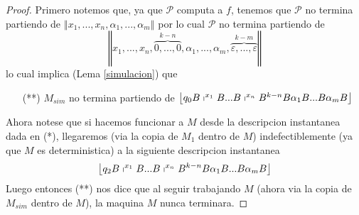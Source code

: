 \begin{frame}
\begin{proof}
  Primero notemos que, ya que $\mathcal{P}$ computa a $f$, tenemos que $%
  \mathcal{P}$ no termina partiendo de $\left\Vert x_{1},...,x_{n},\alpha
  _{1},...,\alpha _{m}\right\Vert $ por lo cual $\mathcal{P}$ no termina
  partiendo de%
  \begin{equation*}
  \left\Vert x_{1},...,x_{n},\overset{k-n}{\overbrace{0,...,0}},\alpha
  _{1},...,\alpha _{m},\overset{k-m}{\overbrace{\varepsilon ,...,\varepsilon }}%
  \right\Vert
  \end{equation*}%
  lo cual implica (Lema \ref{simulacion}) que

  \begin{enumerate}
  \item[(**)] $M_{sim}$ no termina partiendo de $\left\lfloor q_{0}B\shortmid
  ^{x_{1}}B...B\shortmid ^{x_{n}}B^{k-n}B\alpha _{1}B...B\alpha
  _{m}B\right\rfloor $
  \end{enumerate}

  Ahora notese que si hacemos funcionar a $M$ desde la descripcion instantanea
  dada en (*), llegaremos (via la copia de $M_{1}$ dentro de $M$)
  indefectiblemente (ya que $M$ es deterministica) a la siguiente descripcion
  instantanea%
  \begin{equation*}
  \left\lfloor q_{2}B\shortmid ^{x_{1}}B...B\shortmid ^{x_{n}}B^{k-n}B\alpha
  _{1}B...B\alpha _{m}B\right\rfloor
  \end{equation*}%
  Luego entonces (**) nos dice que al seguir trabajando $M$ (ahora via la
  copia de $M_{sim}$ dentro de $M$), la maquina $M$ nunca terminara.


\end{proof}
\end{frame}
